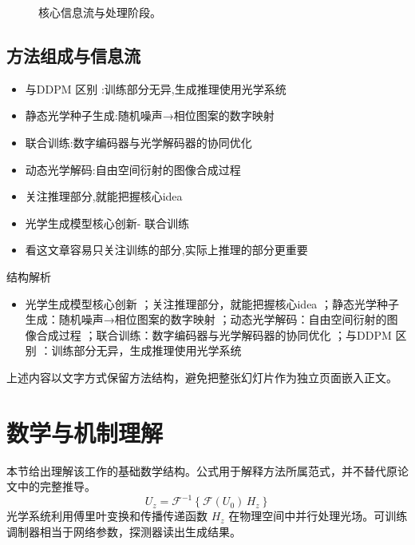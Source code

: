 \documentclass[UTF8,11pt,a4paper]{ctexart}
\begin{document}
\begin{figure}[H]
\centering
{}
\caption{核心信息流与处理阶段。}
\end{figure}

\subsection{方法组成与信息流}
\begin{itemize}
\item 与DDPM 区别 :训练部分无异,生成推理使用光学系统
\item 静态光学种子生成:随机噪声→相位图案的数字映射
\item 联合训练:数字编码器与光学解码器的协同优化
\item 动态光学解码:自由空间衍射的图像合成过程
\item 关注推理部分,就能把握核心idea
\item 光学生成模型核心创新- 联合训练
\item 看这文章容易只关注训练的部分,实际上推理的部分更重要
\end{itemize}

\begin{keybox}{结构解析}
\begin{itemize}
\item 光学生成模型核心创新 ；关注推理部分，就能把握核心idea ；静态光学种子生成：随机噪声→相位图案的数字映射 ；动态光学解码：自由空间衍射的图像合成过程 ；联合训练：数字编码器与光学解码器的协同优化 ；与DDPM 区别 ：训练部分无异，生成推理使用光学系统
\end{itemize}
\end{keybox}

上述内容以文字方式保留方法结构，避免把整张幻灯片作为独立页面嵌入正文。

\section{数学与机制理解}
本节给出理解该工作的基础数学结构。公式用于解释方法所属范式，并不替代原论文中的完整推导。
\begin{equation}
U_z=\mathcal F^{-1}\!\left\{\mathcal F(U_0)\,H_z\right\}
\end{equation}
光学系统利用傅里叶变换和传播传递函数 $H_z$ 在物理空间中并行处理光场。可训练调制器相当于网络参数，探测器读出生成结果。
\end{document}
